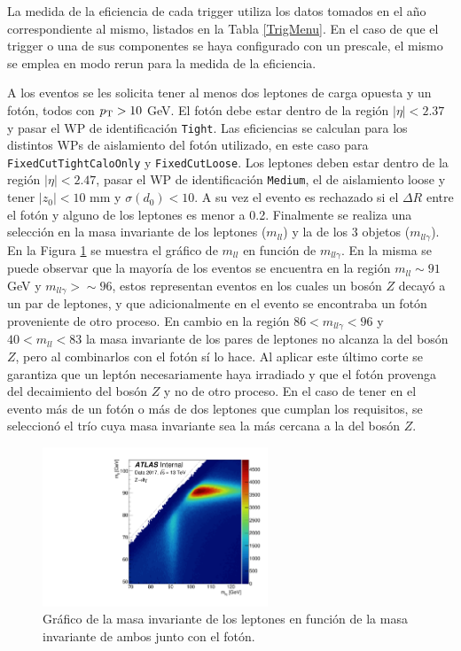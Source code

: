 La medida de la eficiencia de cada trigger utiliza los datos tomados en el año correspondiente al mismo, listados en la Tabla \ref{TrigMenu}. En el caso de que el trigger o una de sus componentes se haya configurado con un prescale, el mismo se emplea en modo rerun para la medida de la eficiencia. 


A los eventos se les solicita tener al menos dos leptones de carga opuesta y un fotón, todos con $p_{\text{T}}>10$ GeV. El fotón debe estar dentro de la región $|\eta| < 2.37$ y pasar el WP de identificación \texttt{Tight}. Las eficiencias se calculan para los distintos WPs de aislamiento del fotón utilizado, en este caso para \texttt{FixedCutTightCaloOnly} y \texttt{FixedCutLoose}. Los leptones deben estar dentro de la región $|\eta| < 2.47$, pasar el WP de identificación \texttt{Medium}, el de aislamiento loose y tener $|z_0| < 10$ mm y $\sigma(d_0) < 10$. A su vez el evento es rechazado si el $\Delta R$ entre el fotón y alguno de los leptones es menor a 0.2. Finalmente se realiza una selección en la masa invariante de los leptones ($m_{ll}$) y la de los 3 objetos ($m_{ll\gamma}$). En la Figura \ref{mllgmll} se muestra el gráfico de $m_{ll}$ en función de $m_{ll\gamma}$. En la misma se puede observar que la mayoría de los eventos se encuentra en la región $m_{ll}\sim91$ GeV y $m_{ll\gamma}>\sim96$, estos representan eventos en los cuales un bosón $Z$ decayó a un par de leptones, y que adicionalmente en el evento se encontraba un fotón proveniente de otro proceso. En cambio en la región $86<m_{ll\gamma}<96$ y $40<m_{ll}<83$ la masa invariante de los pares de leptones no alcanza la del bosón $Z$, pero al combinarlos con el fotón sí lo hace. Al aplicar este último corte se garantiza que un leptón necesariamente haya irradiado y que el fotón provenga del decaimiento del bosón $Z$ y no de otro proceso. En el caso de tener en el evento más de un fotón o más de dos leptones que cumplan los requisitos, se seleccionó el trío cuya masa invariante sea la más cercana a la del bosón $Z$.

\begin{figure}
  \centering
  \includegraphics[width=0.6\textwidth]{images/trigger/h_mllg_mll.pdf}
	\caption{Gráfico de la masa invariante de los leptones en función de la masa invariante de ambos junto con el fotón.}
  \label{mllgmll}
\end{figure}

